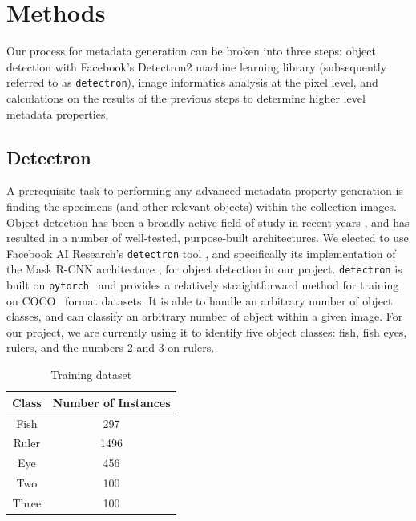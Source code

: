 \documentclass[conference]{IEEEtran}
\begin{document}
\section{Methods}
Our process for metadata generation can be broken into three steps: object detection with Facebook's Detectron2 machine learning library (subsequently referred to as \verb|detectron|), image informatics analysis at the pixel level, and calculations on the results of the previous steps to determine higher level metadata properties.

\subsection{Detectron}
A prerequisite task to performing any advanced metadata property generation
is finding the specimens (and other relevant objects) within the collection
images. Object detection has been a broadly active field of study in recent
years \cite{zou2019object}, and has resulted in a number of well-tested, purpose-built architectures. We elected to use Facebook AI Research's \verb|detectron| tool \cite{wu2019detectron2}, and specifically its implementation of the Mask R-CNN architecture \cite{he2018mask}, for object detection in our project.
\verb|detectron| is built on \verb|pytorch|~\cite{NEURIPS2019_9015} and provides a relatively straightforward method for training on COCO~\cite{DBLP:journals/corr/LinMBHPRDZ14} format datasets. It is able to handle an arbitrary number of object classes, and can classify an arbitrary number of object within a given image. For our project, we are currently using it to identify five object classes: fish, fish eyes, rulers, and the numbers 2 and 3 on rulers.

\begin{table}
    \centering
      \caption{Training dataset}
    \label{tab:dataset}
    \begin{tabular}{cc}
        \toprule
        \textbf{Class} & \textbf{Number of Instances}\\
        \midrule
        Fish & 297\\
        Ruler & 1496\\
        Eye & 456\\
        Two & 100\\
        Three & 100\\
      \bottomrule
    \end{tabular}
\end{table}
\end{document}
